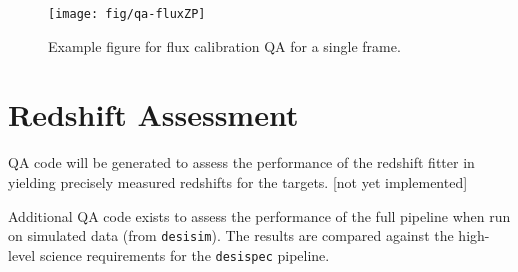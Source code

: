 \documentclass[12pt]{article}
\begin{document}
\begin{figure}[htb]
\begin{center}
\texttt{[image: fig/qa-fluxZP]}
\caption{Example figure for flux calibration QA
for a single frame.  
}
\label{fig:fluxcalib_frame}
\end{center}
\end{figure}

\section{Redshift Assessment}

QA code will be generated to assess the performance
of the redshift fitter in yielding precisely measured
redshifts for the targets.  
[not yet implemented]


Additional QA code exists to assess the performance
of the full pipeline when run on simulated data
(from {\tt desisim}).
The results are compared against the high-level
science requirements for the {\tt desispec} pipeline.




\def\apjl{ApJL} %
\def\aj{AJ} %
\def\apj{ApJ} %
\def\pasp{PASP} %
\def\spie{SPIE} %
\def\apjs{ApJS} %
\def\araa{ARAA} %
\def\aap{A\&A} %
\def\aaps{A\&A~Supl.} %
\def\nat{Nature} %
\def\nar{New Astron. Rev.} %
\def\mnras{MNRAS} %
\def\jcap{JCAP} %
\def\prd{{Phys.~Rev.~D}}        %
\def\physrep{{Phys.~Reports}} %



\end{document}
